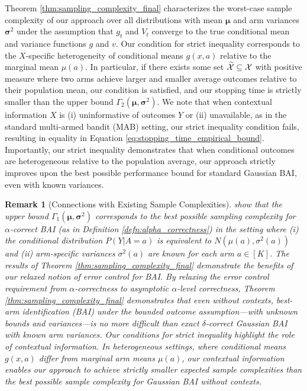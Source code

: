 \documentclass{article}
\newtheorem{remark}{Remark}
\begin{document}
Theorem \ref{thm:sampling_complexity_final} characterizes the worst-case sample complexity of our approach over all distributions with mean $\bm{\mu}$ and arm variances $\bm{\sigma}^2$ under the assumption that $g_t$ and $V_t$ converge to the true conditional mean and variance functions $g$ and $v$. Our condition for strict inequality corresponds to the $X$-specific heterogeneity of conditional means $g(x,a)$ relative to the marginal mean $\mu(a)$. In particular, if there exists some set $\widetilde{\mathcal{X}} \subseteq \mathcal{X}$ with positive measure where two arms achieve larger and smaller average outcomes relative to their population mean, our condition is satisfied, and our stopping time is strictly smaller than the upper bound $\Gamma_2(\bm\mu,\bm\sigma^2)$. We note that when contextual information $X$ is (i) uninformative of outcomes $Y$ or (ii) unavailable, as in the standard multi-armed bandit (MAB) setting, our strict inequality condition fails, resulting in equality in Equation \eqref{eq:stopping_time_empirical_bound}. Importantly, our strict inequality demonstrates that when conditional outcomes are heterogeneous relative to the population average, our approach strictly improves upon the best possible performance bound for standard Gaussian BAI, even with known variances.  

\begin{remark}[Connections with Existing Sample Complexities]\cite{garivier2016optimalbestarmidentification} show that the upper bound $\Gamma_1(\bm{\mu}, \bm\sigma^2)$ corresponds to the \textit{best possible sampling complexity} for $\alpha$-correct BAI (as in Definition \ref{defn:alpha_correctness}) in the setting where (i) the conditional distribution $P(Y|A=a)$ is equivalent to $N(\mu(a), \sigma^2(a))$ and (ii) arm-specific variances $\sigma^2(a)$ are known for each arm $a \in [K]$. The results of Theorem \ref{thm:sampling_complexity_final} demonstrate the benefits of our relaxed notion of error control for BAI. By relaxing the error control requirement from $\alpha$-correctness to asymptotic $\alpha$-level correctness, Theorem \ref{thm:sampling_complexity_final} demonstrates that even without contexts, best-arm identification (BAI) under the bounded outcome assumption—with unknown bounds and variances—is no more difficult than exact $\delta$-correct Gaussian BAI with known arm variances. Our conditions for strict inequality highlight the role of contextual information. In heterogeneous settings, where conditional means $g(x,a)$ differ from marginal arm means $\mu(a)$, our contextual information enables our approach to achieve strictly smaller expected sample complexities than the best possible sample complexity for Gaussian BAI without contexts.
\end{remark}
\end{document}

